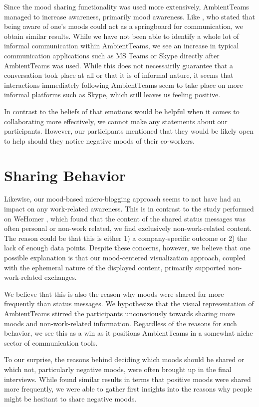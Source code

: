 Since the mood sharing functionality was used more extensively, AmbientTeams managed to increase awareness, primarily mood awareness. Like \textcite{church2010study}, who stated that being aware of one's moods could act as a springboard for communication, we obtain similar results. While we have not been able to identify a whole lot of informal communication within AmbientTeams, we see an increase in typical communication applications such as MS Teams or Skype directly after AmbientTeams was used. While this does not necessairily guarantee that a conversation took place at all or that it is of informal nature, it seems that interactions immediately following AmbientTeams seem to take place on more informal platforms such as Skype, which still leaves us feeling positive. 

In contrast to the beliefs of \textcite{garcia1999emotional} that emotions would be helpful when it comes to collaborating more effectively, we cannot make any statements about our participants. However, our participants mentioned that they would be likely open to help should they notice negative moods of their co-workers. 

\section{Sharing Behavior}
Likewise, our mood-based micro-blogging approach seems to not have had an impact on any work-related awareness.
This is in contrast to the study performed on WeHomer \autocite{dullemond2013fixing}, which found that the content of the shared status messages was often personal or non-work related, we find exclusively non-work-related content. The reason could be that this is either 1) a company-specific outcome or 2) the lack of enough data points. Despite these concerns, however, we believe that one possible explanation is that our mood-centered visualization approach, coupled with the ephemeral nature of the displayed content, primarily supported non-work-related exchanges.

We believe that this is also the reason why moods were shared far more frequently than status messages. We hypothesize that the visual representation of AmbientTeams stirred the participants unconsciously towards sharing more moods and non-work-related information. Regardless of the reasons for such behavior, we see this as a win as it positions AmbientTeams in a somewhat niche sector of communication tools.

To our surprise, the reasons behind deciding which moods should be shared or which not, particularly negative moods, were often brought up in the final interviews. While \textcite{dullemond2013fixing} found similar results in terms that positive moods were shared more frequently, we were able to gather first insights into the reasons why people might be hesitant to share negative moods.

